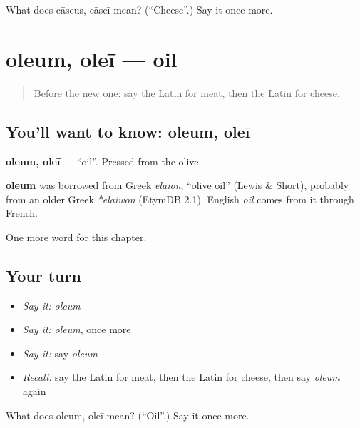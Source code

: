 \begin{tcolorbox}[breakable,colback=teal!4,colframe=teal!35!black,title={Before you move on}]
What does cāseus, cāseī mean? (\textquotedblleft{}Cheese\textquotedblright{}.) Say it once more.
\end{tcolorbox}
\section[oleum, oleī]{oleum, oleī — oil}

\label{lesson:LA-C80-oleum}



\begin{quote}
Before the new one: say the Latin for meat, then the Latin for cheese.
\end{quote}

\subsection*{You'll want to know: oleum, oleī}
\textbf{oleum, oleī} — \textquotedblleft{}oil\textquotedblright{}. Pressed from the olive.

\begin{cousinweb}
\textbf{oleum} was borrowed from Greek \emph{elaion}, \textquotedblleft{}olive oil\textquotedblright{} (Lewis \& Short), probably from an older Greek \emph{*elaiwon} (EtymDB 2.1). English \emph{oil} comes from it through French.
\end{cousinweb}

\begin{grammarlens}[title={What you've built}]
One more word for this chapter.
\end{grammarlens}

\subsection*{Your turn}
\begin{itemize}
\raggedright
  \item \emph{Say it:} \emph{oleum}
  \item \emph{Say it:} \emph{oleum}, once more
  \item \emph{Say it:} say \emph{oleum}
  \item \emph{Recall:} say the Latin for meat, then the Latin for cheese, then say \emph{oleum} again
\end{itemize}

\begin{tcolorbox}[breakable,colback=teal!4,colframe=teal!35!black,title={Before you move on}]
What does oleum, oleī mean? (\textquotedblleft{}Oil\textquotedblright{}.) Say it once more.
\end{tcolorbox}

